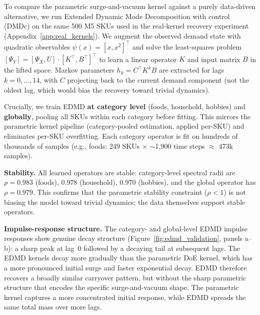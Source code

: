 \documentclass[10pt]{article} %
\theoremstyle{plain}
\theoremstyle{definition}
\begin{document}
To compare the parametric surge-and-vacuum kernel against a purely data-driven alternative, we run Extended Dynamic Mode Decomposition with control (DMDc) on the same 500 M5 SKUs used in the real-kernel recovery experiment (Appendix~\ref{app:real_kernels}). We augment the observed demand state with quadratic observables $\psi(x) = [x, x^2]^\top$ and solve the least-squares problem $[\Psi_{Y}]=[\Psi_{X}, U] \cdot [K^\top, B^\top]^\top$ to learn a linear operator $K$ and input matrix $B$ in the lifted space. Markov parameters $h_k = C^\top K^k B$ are extracted for lags $k = 0, \dots, 14$, with $C$ projecting back to the current demand component (not the oldest lag, which would bias the recovery toward trivial dynamics).

Crucially, we train EDMD \textbf{at category level} (foods, household, hobbies) and \textbf{globally}, pooling all SKUs within each category before fitting. This mirrors the parametric kernel pipeline (category-pooled estimation, applied per-SKU) and eliminates per-SKU overfitting. Each category operator is fit on hundreds of thousands of samples (e.g., foods: 249 SKUs $\times$ $\sim$1,900 time steps $\approx$ 473k samples).

\textbf{Stability.} All learned operators are stable: category-level spectral radii are $\rho = 0.983$ (foods), $0.978$ (household), $0.970$ (hobbies), and the global operator has $\rho = 0.979$. This confirms that the parametric stability constraint ($\rho < 1$) is not biasing the model toward trivial dynamics; the data themselves support stable operators.

\textbf{Impulse-response structure.} The category- and global-level EDMD impulse responses show genuine decay structure (Figure~\ref{fig:edmd_validation}, panels a--b): a sharp peak at lag~0 followed by a decaying tail at subsequent lags. The EDMD kernels decay more gradually than the parametric DoE kernel, which has a more pronounced initial surge and faster exponential decay. EDMD therefore recovers a broadly similar carryover pattern, but without the sharp parametric structure that encodes the specific surge-and-vacuum shape. The parametric kernel captures a more concentrated initial response, while EDMD spreads the same total mass over more lags.
\end{document}
